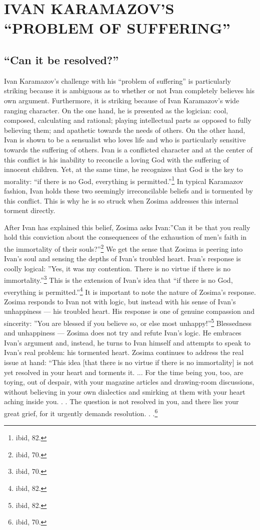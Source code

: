 \chapter{IVAN KARAMAZOV'S ``PROBLEM OF SUFFERING''}
	\section{``Can it be resolved?''}
	Ivan Karamazov's challenge with his ``problem of suffering'' is particularly striking because it is ambiguous as to whether or not Ivan completely believes his own argument. Furthermore, it is striking because of Ivan Karamazov's wide ranging character. On the one hand, he is presented as the logician: cool, composed, calculating and rational; playing intellectual parts as opposed to fully believing them; and apathetic towards the needs of others. On the other hand, Ivan is shown to be a sensualist who loves life and who is particularly sensitive towards the suffering of others. Ivan is a conflicted character and at the center of this conflict is his inability to reconcile a loving God with the suffering of innocent children. Yet, at the same time, he recognizes that God is the key to morality: ``if there is no God, everything is permitted.''\footnote{ibid, 82.} In typical Karamazov fashion, Ivan holds these two seemingly irreconcilable beliefs and is tormented by this conflict. This is why he is so struck when Zosima addresses this internal torment directly.
	
	After Ivan has explained this belief, Zosima asks Ivan:''Can it be that you really hold this conviction about the consequences of the exhaustion of men's faith in the immortality of their souls?''\footnote{ibid, 70.} We get the sense that Zosima is peering into Ivan's soul and sensing the depths of Ivan's troubled heart. Ivan's response is coolly logical: ''Yes, it was my contention. There is no virtue if there is no immortality.''\footnote{ibid, 70.} This is the extension of Ivan's idea that ``if there is no God, everything is permitted.''\footnote{ibid, 82.} It is important to note the nature of Zosima's response. Zosima responds to Ivan not with logic, but instead with his sense of Ivan's unhappiness --- his troubled heart. His response is one of genuine compassion and sincerity: ''You are blessed if you believe so, or else most unhappy!''\footnote{ibid, 82.} Blessedness and unhappiness --- Zosima does not try and refute Ivan's logic. He embraces Ivan's argument and, instead, he turns to Ivan himself and attempts to speak to Ivan's real problem: his tormented heart. Zosima continues to address the real issue at hand: ``This idea [that there is no virtue if there is no immortality] is not yet resolved in your heart and torments it. ... For the time being you, too, are toying, out of despair, with your magazine articles and drawing-room discussions, without believing in your own dialectics and smirking at them with your heart aching inside you. . . The question is not resolved in you, and there lies your great grief, for it urgently demands resolution. . .\footnote{ibid, 70.}

